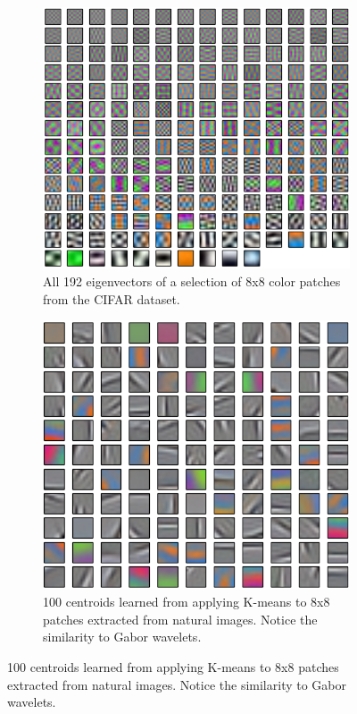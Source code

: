 \documentclass{article} %
\begin{document}
\begin{enumerate}
\begin{figure}
  \centering
  \begin{subfigure}[h]{0.45\columnwidth}
    \includegraphics[width=\columnwidth]{./images/eigs192.png}
    \caption{All 192 eigenvectors of a selection of 8x8 color patches from the CIFAR dataset.}
    \label{figEigenvectors}
  \end{subfigure}
  \hspace{0.04\columnwidth}
  \centering
  \begin{subfigure}[h]{0.45\columnwidth}
    \includegraphics[width=\columnwidth]{./images/patches100.png}
    \caption{100 centroids learned from applying K-means to 8x8 patches extracted from natural images. Notice the similarity to Gabor wavelets.}
    \label{fig_centroids}
  \end{subfigure}
\end{figure}


\end{enumerate}
\end{document}
